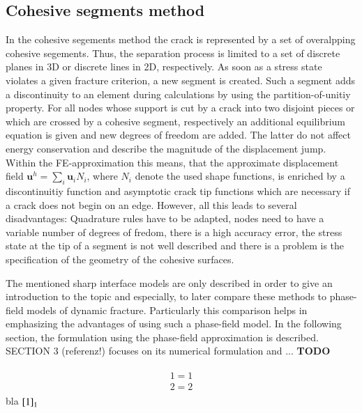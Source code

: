 \subsection{Cohesive segments method} \label{sec:intro_cohes}
In the cohesive segements method the crack is represented by a set of overalpping cohesive segements. Thus, the separation process is limited to a set of discrete planes in 3D or discrete lines in 2D, respectively. As soon as a stress state violates a given fracture criterion, a new segment is created. Such a segment adds a discontinuity to an element during calculations by using the partition-of-unitiy property. For all nodes whose support is cut by a crack into two disjoint pieces or which are crossed by a cohesive segment, respectively an additional equilibrium equation is given and new degrees of freedom are added. The latter do not affect energy conservation and describe the magnitude of the displacement jump. Within the FE-approximation this means, that the approximate displacement field $\mathbf{u}^{h}=\sum_{i}\mathbf{u}_{i}N_{i}$, where $N_{i}$ denote the used shape functions, is enriched by a discontinuitiy function and asymptotic crack tip functions which are necessary if a crack does not begin on an edge. However, all this leads to several disadvantages: Quadrature rules have to be adapted, nodes need to have a variable number of degrees of fredom, there is a high accuracy error, the stress state at the tip of a segment is not well described and there is a problem is the specification of the geometry of the cohesive surfaces. \cite{02_SotA_cohes}\cite{01_SotA_cohes_dyn}

The mentioned sharp interface models are only described in order to give an introduction to the topic and especially, to later compare these methods to phase-field models of dynamic fracture. Particularly this comparison helps in emphasizing the advantages of using such a phase-field model. In the following section, the formulation using the phase-field approximation is described. SECTION 3 (referenz!) focuses on its numerical formulation and ... \textbf{TODO}


\begin{align}
\begin{aligned}   \label{1}
1=1 \\
2=2 
\end{aligned}
\end{align}
bla ${\eqref{1}}_{1}$


